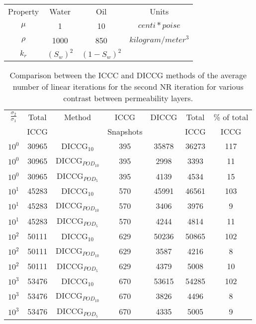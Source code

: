 \documentclass[a4paper,10pt]{report}
\begin{document}
\begin{table}[!ht]
\centering
\begin{tabular}{ |c|c|c|c|} 
\hline
Property&Water&Oil&Units\\
$\mu$&     1&    10 & $centi*poise$  \\  
$\rho$& 1000& 850& $kilogram/meter^3$\\
$k_r$&$(S_w)^2$&   $(1-S_w)^2$ &  \\
 \hline
\end{tabular}
\label{table:fluid}
\end{table} 


\begin{table}[!ht]\centering
\begin{minipage}{1\textwidth}
 \centering
\begin{tabular}{ ||c|c||c|c|c|c|c||} 
\hline
$\frac{\sigma_2}{\sigma_1}$&Total&Method  & ICCG&DICCG &Total&\% of total\\ 
                           & ICCG     &  & Snapshots& &ICCG& ICCG\\ 
                           \hline
$10^{0}$ &30965& DICCG$_{10}$&395&35878&36273&117\\ 
\hline  
$10^{0}$ &30965& DICCG$_{POD_{10}}$&395&2998&3393&11 \\ 
\hline  
$10^{0}$ &30965& DICCG$_{POD_{5}}$&395&4139&4534&15 \\ 
\hline  
$10^{1}$ &45283& DICCG$_{10}$&570&45991&46561&103\\ 
\hline  
$10^{1}$ &45283& DICCG$_{POD_{10}}$&570&3406&3976&9 \\ 
\hline  
$10^{1}$ &45283& DICCG$_{POD_{5}}$&570&4244&4814&11 \\ 
\hline  
$10^{2}$ &50111& DICCG$_{10}$&629&50236&50865&102\\ 
\hline  
$10^{2}$ &50111& DICCG$_{POD_{10}}$&629&3587&4216&8 \\ 
\hline  
$10^{2}$ &50111& DICCG$_{POD_{5}}$&629&4379&5008&10 \\ 
\hline 
$10^{3}$ &53476& DICCG$_{10}$&670&53615&54285&102\\ 
\hline  
$10^{3}$ &53476& DICCG$_{POD_{10}}$&670&3826&4496&8 \\ 
\hline  
$10^{3}$ &53476& DICCG$_{POD_{5}}$&670&4335&5005&9 \\ 
\hline 
\end{tabular} 
\caption{Comparison between the ICCC and DICCG methods of the average number of linear iterations for the second NR iteration for various contrast between permeability layers. }\label{table:litertot2} 
\end{minipage}  
\end{table}  
\end{document}
